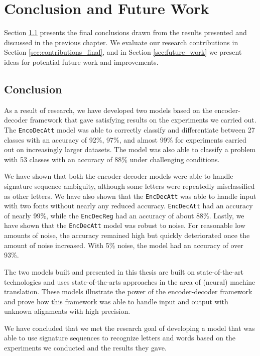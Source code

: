 
\chapter{Conclusion and Future Work}
\label{ch:conclusion}
Section \ref{sec:conclusion} presents the final conclusions drawn from the results presented and discussed in the previous chapter. We evaluate our research contributions in Section \ref{sec:contributions_final}, and in Section \ref{sec:future_work} we present ideas for potential future work and improvements.

\section{Conclusion}
\label{sec:conclusion}
As a result of research, we have developed two models based on the encoder-decoder framework that gave satisfying results on the experiments we carried out. The {\tt EncoDecAtt} model was able to correctly classify and differentiate between 27 classes with an accuracy of 92\%, 97\%, and almost 99\% for experiments carried out on increasingly larger datasets. The model was also able to classify a problem with 53 classes with an accuracy of 88\% under challenging conditions.

We have shown that both the encoder-decoder models were able to handle signature sequence ambiguity, although some letters were repeatedly misclassified as other letters. We have also shown that the {\tt EncDecAtt} was able to handle input with two fonts without nearly any reduced accuracy. {\tt EncDecAtt} had an accuracy of nearly 99\%, while the {\tt EncDecReg} had an accuracy of about 88\%. Lastly, we have shown that the {\tt EncDecAtt} model was robust to noise. For reasonable low amounts of noise, the accuracy remained high but quickly deteriorated once the amount of noise increased. With 5\% noise, the model had an accuracy of over 93\%.

The two models built and presented in this thesis are built on state-of-the-art technologies and uses state-of-the-arts approaches in the area of (neural) machine translation. These models illustrate the power of the encoder-decoder framework and prove how this framework was able to handle input and output with unknown alignments with high precision.

We have concluded that we met the research goal of developing a model that was able to use signature sequences to recognize letters and words based on the experiments we conducted and the results they gave.

